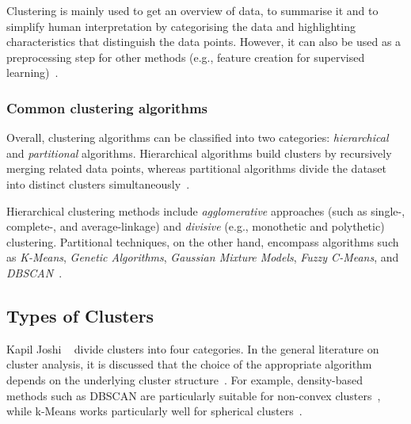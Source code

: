 \documentclass[10pt,twocolumn,letterpaper]{article}
\begin{document}
Clustering is mainly used to get an overview of data, to summarise it and to
simplify human interpretation by categorising the data and highlighting
characteristics that distinguish the data points. However, it can also be used
as a preprocessing step for other methods (e.g., feature creation for
supervised learning)~\cite{Jain2010651}.


\subsubsection{Common clustering algorithms}\label{subsubsec:common-clustering-algorithms}

Overall, clustering algorithms can be classified into two categories:
\textit{hierarchical} and \textit{partitional} algorithms. Hierarchical
algorithms build clusters by recursively merging related data points, whereas
partitional algorithms divide the dataset into distinct clusters
simultaneously~\cite{Ezugwu2022104743,Jain2010651}.

Hierarchical clustering methods include \textit{agglomerative} approaches (such
as single-, complete-, and average-linkage) and \textit{divisive} (e.g.,
monothetic and polythetic) clustering. Partitional techniques, on the other
hand, encompass algorithms such as \textit{K-Means}, \textit{Genetic
    Algorithms}, \textit{Gaussian Mixture Models}, \textit{Fuzzy C-Means}, and
\textit{DBSCAN}~\cite{Ezugwu2022104743}.


\subsection{Types of Clusters}\label{subsec:types-of-clusters}

Kapil Joshi \etal~\cite{Joshi2015} divide clusters into four categories. In the
general literature on cluster analysis, it is discussed that the choice of the
appropriate algorithm depends on the underlying cluster
structure~\cite{Ezugwu2022104743}. For example, density-based methods such as
DBSCAN are particularly suitable for non-convex clusters~\cite{Bhargav2016},
while k-Means works particularly well for spherical
clusters~\cite{Jain2010651}.

\theoremstyle{definition}
\newtheorem{definition}{Definition}[subsubsection]
\end{document}
